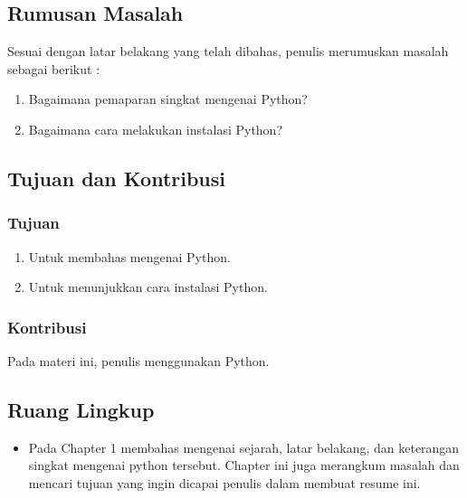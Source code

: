 \subsection{Rumusan Masalah}
Sesuai dengan latar belakang yang telah dibahas, penulis merumuskan masalah sebagai berikut : 
\begin{enumerate}	
	\item Bagaimana pemaparan singkat mengenai Python?
	\item Bagaimana cara melakukan instalasi Python?
\end{enumerate}

\subsection{Tujuan dan Kontribusi}
\subsubsection{Tujuan}
\begin{enumerate}
	\item Untuk membahas mengenai Python.
	\item Untuk menunjukkan cara instalasi Python.
\end{enumerate}

\subsubsection{Kontribusi}
Pada materi ini, penulis menggunakan Python.

\subsection{Ruang Lingkup}
\begin{itemize}
	\item Pada Chapter 1 membahas mengenai sejarah, latar belakang, dan keterangan singkat mengenai python tersebut. Chapter ini juga merangkum masalah dan mencari tujuan yang ingin dicapai penulis dalam membuat resume ini.
\end{itemize}